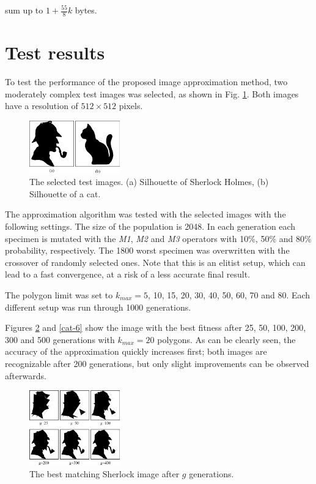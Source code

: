\documentclass[conference]{IEEEtran}
\begin{document}
sum up to $1+\frac{55}{8}k$ bytes.

\section{Test results}

To test the performance of the proposed image approximation
method, two moderately complex test images was selected,
as shown in Fig. \ref{fig-orig}. Both images have a
resolution of $512 \times 512$ pixels.

\begin{figure}[htbp]
	\centering
	\includegraphics[width=0.35\textwidth]{fig/originals.png}
	\caption{The selected test images.
	(a) Silhouette of Sherlock Holmes,
	(b) Silhouette of a cat.}
	\label{fig-orig}
\end{figure}

The approximation algorithm was tested with the selected
images with the following settings. The size of the population
is 2048. In each generation each specimen is mutated with the
\emph{M1}, \emph{M2} and \emph{M3} operators with 10\%, 50\%
and 80\% probability, respectively. The 1800 worst specimen
was overwritten with the crossover of randomly selected ones.
Note that this is an elitist setup, which can lead to a fast
convergence, at a risk of a less accurate final result.

The polygon limit was set to $k_{max}=5$, 10, 15, 20, 30, 40, 50,
60, 70 and 80. Each different setup was run through 1000 generations.

Figures \ref{sherlock-6} and \ref{cat-6} show the image with
the best fitness after 25, 50, 100, 200, 300 and 500 generations
with $k_{max}=20$ polygons. As can be clearly seen, the
accuracy of the approximation quickly increases first; both
images are recognizable after 200 generations, but only slight
improvements can be observed afterwards.

\begin{figure}[htbp]
	\centering
	\includegraphics[width=0.35\textwidth]{fig/sherlock6.png}
	\caption{The best matching Sherlock image after $g$ generations.}
	\label{sherlock-6}
\end{figure}
\end{document}
